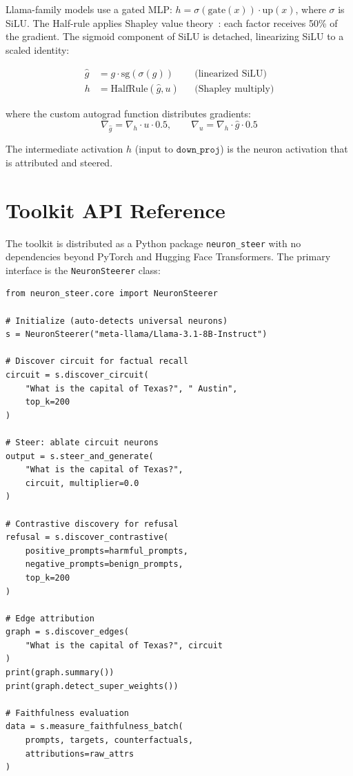 \documentclass[11pt]{article}
\begin{document}
Llama-family models use a gated MLP: $h = \sigma(\text{gate}(x)) \cdot \text{up}(x)$, where $\sigma$ is SiLU.
The Half-rule applies Shapley value theory~\citep{shapley1953value}: each factor receives 50\% of the gradient.
The sigmoid component of SiLU is detached, linearizing SiLU to a scaled identity:

\begin{align}
    \hat{g} &= g \cdot \text{sg}(\sigma(g))  && \text{(linearized SiLU)} \\
    h &= \text{HalfRule}(\hat{g}, u) && \text{(Shapley multiply)}
\end{align}

where the custom autograd function distributes gradients:
\begin{equation}
    \nabla_{\hat{g}} = \nabla_h \cdot u \cdot 0.5, \qquad \nabla_u = \nabla_h \cdot \hat{g} \cdot 0.5
\end{equation}

The intermediate activation $h$ (input to $\texttt{down\_proj}$) is the neuron activation that is attributed and steered.


\section{Toolkit API Reference}
\label{sec:api}

The toolkit is distributed as a Python package \texttt{neuron\_steer} with no dependencies beyond PyTorch and Hugging Face Transformers.
The primary interface is the \texttt{NeuronSteerer} class:

\begin{verbatim}
from neuron_steer.core import NeuronSteerer

# Initialize (auto-detects universal neurons)
s = NeuronSteerer("meta-llama/Llama-3.1-8B-Instruct")

# Discover circuit for factual recall
circuit = s.discover_circuit(
    "What is the capital of Texas?", " Austin",
    top_k=200
)

# Steer: ablate circuit neurons
output = s.steer_and_generate(
    "What is the capital of Texas?",
    circuit, multiplier=0.0
)

# Contrastive discovery for refusal
refusal = s.discover_contrastive(
    positive_prompts=harmful_prompts,
    negative_prompts=benign_prompts,
    top_k=200
)

# Edge attribution
graph = s.discover_edges(
    "What is the capital of Texas?", circuit
)
print(graph.summary())
print(graph.detect_super_weights())

# Faithfulness evaluation
data = s.measure_faithfulness_batch(
    prompts, targets, counterfactuals,
    attributions=raw_attrs
)
\end{verbatim}
\end{document}
